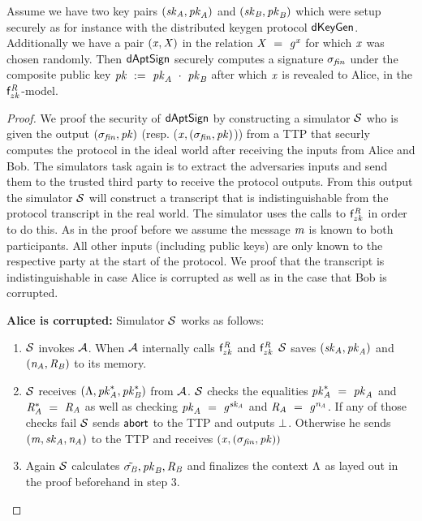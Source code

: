 \begin{theorem}
    Assume we have two key pairs $(\mathit{sk}_{\mathit{A}}, \mathit{pk}_{\mathit{A}})$ and $(\mathit{sk}_{\mathit{B}}, \mathit{pk}_{\mathit{B}})$ which were setup securely as for instance with the distributed keygen protocol $\mathsf{dKeyGen}$.
    Additionally we have a pair $(\mathit{x}, \mathit{X})$ in the relation $\mathit{X} ~=~ \mathit{g}^{\mathit{x}}$ for which $\mathit{x}$ was chosen randomly.
    Then $\mathsf{dAptSign}$ securely computes a signature $\sigma_{\mathit{fin}}$ under the composite public key $\mathit{pk} ~:=~ \mathit{pk}_{\mathit{A}} ~\cdot~ \mathit{pk}_{\mathit{B}}$ after which $\mathit{x}$ is revealed to Alice, in the $\mathsf{f}^{\mathit{R}}_{zk}$-model.
\end{theorem}


\begin{proof}
    We proof the security of $\mathsf{dAptSign}$ by constructing a simulator $\mathcal{S}$ who is given the output $(\sigma_{\mathit{fin}}, \mathit{pk})$ (resp. ($\mathit{x}, (\sigma_{\mathit{fin}}, \mathit{pk})$)) from a TTP that securly computes the protocol in the ideal world after receiving the inputs from Alice and Bob.
    The simulators task again is to extract the adversaries inputs and send them to the trusted third party to receive the protocol outputs.
    From this output the simulator $\mathcal{S}$ will construct a transcript that is indistinguishable from the protocol transcript in the real world.
    The simulator uses the calls to $\mathsf{f}^{\mathit{R}}_{zk}$ in order to do this.
    As in the proof before we assume the message $\mathit{m}$ is known to both participants.
    All other inputs (including public keys) are only known to the respective party at the start of the protocol.
    We proof that the transcript is indistinguishable in case Alice is corrupted as well as in the case that Bob is corrupted.

    \textbf{Alice is corrupted: } Simulator $\mathcal{S}$ works as follows:
    \begin{enumerate}
        \item $\mathcal{S}$ invokes $\mathcal{A}$.
        When $\mathcal{A}$ internally calls $\mathsf{f}^{\mathit{R}}_{zk}$ and $\mathsf{f}^{\mathit{R}}_{zk}$ $\mathcal{S}$ saves $(\mathit{sk}_{\mathit{A}}, \mathit{pk}_{\mathit{A}})$ and $(\mathit{\mathit{n}_{\mathit{A}}}, \mathit{R}_{\mathit{B}})$ to its memory.
        \item $\mathcal{S}$ receives $(\Lambda, \mathit{pk}_{\mathit{A}}^*, \mathit{pk}_{\mathit{B}}^*)$ from $\mathcal{A}$.
        $\mathcal{S}$ checks the equalities $\mathit{pk}_{\mathit{A}}^* ~=~ \mathit{pk}_{\mathit{A}}$ and $\mathit{R}_{\mathit{A}}^* ~=~ \mathit{R}_{\mathit{A}}$ as well as checking $\mathit{pk}_{\mathit{A}} ~=~ \mathit{g}^{\mathit{sk}_{\mathit{A}}}$ and $\mathit{R}_{\mathit{A}} ~=~ \mathit{g}^{\mathit{\mathit{n}_{\mathit{A}}}}$.
        If any of those checks fail $\mathcal{S}$ sends $\mathsf{abort}$ to the TTP and outputs $\bot$.
        Otherwise he sends $(\mathit{m}, \mathit{sk}_{\mathit{A}}, \mathit{\mathit{n}_{\mathit{A}}})$ to the TTP and receives $(\mathit{x}, (\sigma_{\mathit{fin}}, \mathit{pk}))$
        \item Again $\mathcal{S}$ calculates $\tilde{\sigma_{\mathit{B}}}, \mathit{pk}_{\mathit{B}}, \mathit{R}_{\mathit{B}}$ and finalizes the context $\Lambda$ as layed out in the proof beforehand in step 3.
        

\end{enumerate}
\end{proof}
